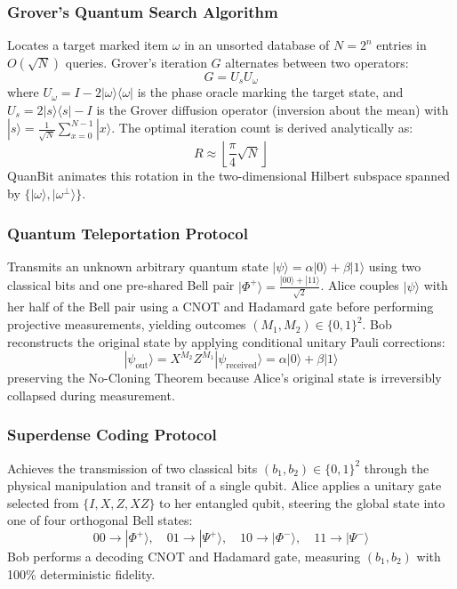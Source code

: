 \documentclass[conference]{IEEEtran}
\begin{document}
\subsubsection{Grover's Quantum Search Algorithm}
Locates a target marked item $\omega$ in an unsorted database of $N=2^n$ entries in $O(\sqrt{N})$ queries. Grover's iteration $G$ alternates between two operators:
\begin{equation}
G = U_s U_\omega
\end{equation}
where $U_\omega = I - 2|\omega\rangle\langle\omega|$ is the phase oracle marking the target state, and $U_s = 2|s\rangle\langle s| - I$ is the Grover diffusion operator (inversion about the mean) with $|s\rangle = \frac{1}{\sqrt{N}}\sum_{x=0}^{N-1}|x\rangle$. The optimal iteration count is derived analytically as:
\begin{equation}
R \approx \left\lfloor \frac{\pi}{4}\sqrt{N} \right\rfloor
\end{equation}
QuanBit animates this rotation in the two-dimensional Hilbert subspace spanned by $\{|\omega\rangle, |\omega^\perp\rangle\}$.

\subsubsection{Quantum Teleportation Protocol}
Transmits an unknown arbitrary quantum state $|\psi\rangle = \alpha|0\rangle + \beta|1\rangle$ using two classical bits and one pre-shared Bell pair $|\Phi^+\rangle = \frac{|00\rangle + |11\rangle}{\sqrt{2}}$. Alice couples $|\psi\rangle$ with her half of the Bell pair using a CNOT and Hadamard gate before performing projective measurements, yielding outcomes $(M_1, M_2) \in \{0, 1\}^2$. Bob reconstructs the original state by applying conditional unitary Pauli corrections:
\begin{equation}
|\psi_{\text{out}}\rangle = X^{M_2} Z^{M_1} |\psi_{\text{received}}\rangle = \alpha|0\rangle + \beta|1\rangle
\end{equation}
preserving the No-Cloning Theorem because Alice's original state is irreversibly collapsed during measurement.

\subsubsection{Superdense Coding Protocol}
Achieves the transmission of two classical bits $(b_1, b_2) \in \{0, 1\}^2$ through the physical manipulation and transit of a single qubit. Alice applies a unitary gate selected from $\{I, X, Z, XZ\}$ to her entangled qubit, steering the global state into one of four orthogonal Bell states:
\begin{equation}
00 \to |\Phi^+\rangle, \quad 01 \to |\Psi^+\rangle, \quad 10 \to |\Phi^-\rangle, \quad 11 \to |\Psi^-\rangle
\end{equation}
Bob performs a decoding CNOT and Hadamard gate, measuring $(b_1, b_2)$ with 100\% deterministic fidelity.
\end{document}
